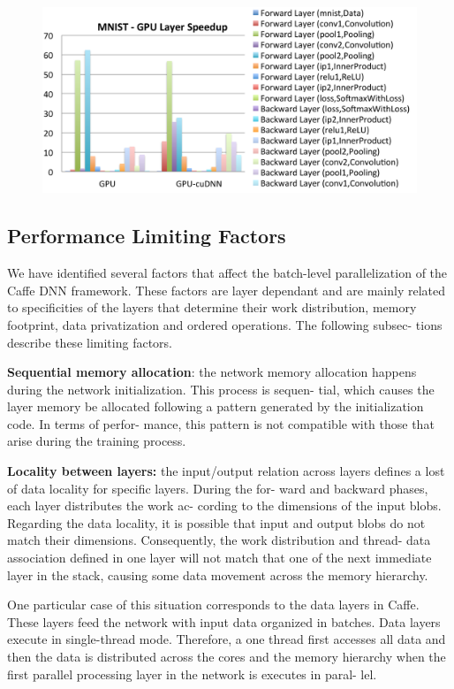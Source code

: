 \begin{figure}[]
\includegraphics[width=\linewidth]{figures/mnist-gpu-layer-speedup.pdf}
\caption{}
\end{figure}

\subsection{Performance Limiting Factors}
We have identified several factors that affect the batch-level
parallelization of the Caffe DNN framework. These factors are
layer dependant and are mainly related to specificities of the
layers that determine their work distribution, memory footprint,
data privatization and ordered operations. The following subsec-
tions describe these limiting factors.

\textbf{Sequential memory allocation}: the network memory allocation
happens during the network initialization. This process is sequen-
tial, which causes the layer memory be allocated following a
pattern generated by the initialization code. In terms of perfor-
mance, this pattern is not compatible with those that arise during
the training process.

\textbf{Locality between layers:} the input/output relation across layers
defines a lost of data locality for specific layers. During the for-
ward and backward phases, each layer distributes the work ac-
cording to the dimensions of the input blobs. Regarding the data
locality, it is possible that input and output blobs do not match
their dimensions. Consequently, the work distribution and thread-
data association defined in one layer will not match that one of the
next immediate layer in the stack, causing some data movement
across the memory hierarchy.

One particular case of this situation corresponds to the data
layers in Caffe. These layers feed the network with input data
organized in batches. Data layers execute in single-thread mode.
Therefore, a one thread first accesses all data and then the data is
distributed across the cores and the memory hierarchy when the
first parallel processing layer in the network is executes in paral-
lel. 

